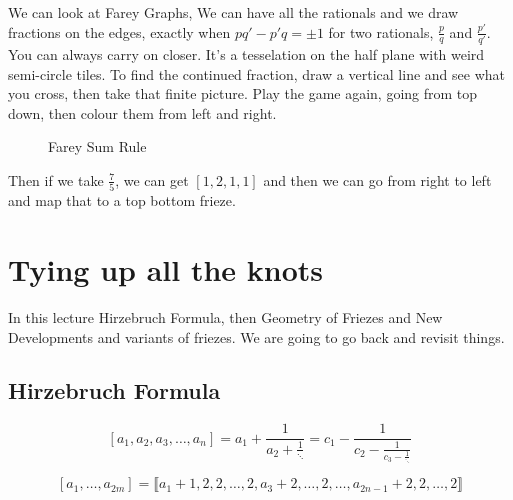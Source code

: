 \documentclass{article}
\begin{document}
We can look at Farey Graphs,
We can have all the rationals and we draw fractions on the edges, exactly when $pq' - p'q =\pm1$ for two rationals, $\frac{p}{q}$ and $\frac{p'}{q'}$. You can always carry on closer. It's a tesselation on the half plane with weird semi-circle tiles. To find the continued fraction, draw a vertical line and see what you cross, then take that finite picture. Play the game again, going from top down, then colour them from left and right. \\


\begin{figure}[!ht]
\centering
{}
\caption{Farey Sum Rule}
\end{figure}

Then if we take $\frac{7}{5}$, we can get $[1, 2, 1, 1]$ and then we can go from right to left and map that to a top bottom frieze.

\section{Tying up all the knots}
In this lecture Hirzebruch Formula, then Geometry of Friezes and New Developments and variants of friezes. We are going to go back and revisit things.\\

\subsection{Hirzebruch Formula}

\begin{nthm}
  $$ [a_1, a_2, a_3, \dots, a_n] = a_1 + \frac{1}{a_2 + \frac{1}{\ddots}} = c_1 - \frac{1}{c_2 - \frac{1}{c_3 - \frac{1}{\ddots}}}$$
\end{nthm}

\begin{claim}
  $$ [a_1, \dots, a_{2m}] = \llbracket a_1 + 1, 2,2, \dots, 2, a_3 + 2, \dots, 2, \dots, a_{2n-1} + 2, 2, \dots, 2\rrbracket $$
\end{claim}
\end{document}
